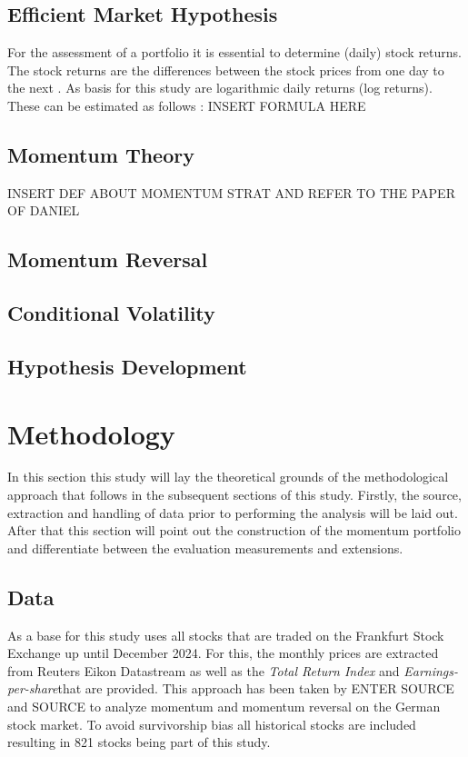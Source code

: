 \documentclass[12pt]{article}
\begin{document}
\subsection{Efficient Market Hypothesis} \label{subsection:EMH}
For the assessment of a portfolio it is essential to determine (daily) stock returns. The stock returns are the differences between the stock prices from one day to the next \parencite{Tsay2002}. As basis for this study are logarithmic daily returns (log returns). These can be estimated as follows \parencite{Tsay2002}: 
INSERT FORMULA HERE



\subsection{Momentum Theory} \label{subsection:Momentum_theory}

INSERT DEF ABOUT MOMENTUM STRAT
AND REFER TO THE PAPER OF DANIEL


\subsection{Momentum Reversal} \label{subsection:Momentum_reversal}

\subsection{Conditional Volatility} \label{subsection:condvol}


\subsection{Hypothesis Development} \label{subsection:Hypotheses}


\section{Methodology} \label{section:Method}
In this section this study will lay the theoretical grounds of the methodological approach that follows in the subsequent sections of this study. Firstly, the source, extraction and handling of data prior to performing the analysis will be laid out. After that this section will point out the construction of the momentum portfolio and differentiate between the evaluation measurements and extensions.

\subsection{Data} \label{subsection:Data}
As a base for this study uses all stocks that are traded on the Frankfurt Stock Exchange up until December 2024. For this, the monthly prices are extracted from Reuters Eikon Datastream as well as the \textit{Total Return Index} and \textit{Earnings-per-share}that are provided. This approach has been taken by ENTER SOURCE and SOURCE to analyze momentum and momentum reversal on the German stock market. To avoid survivorship bias all historical stocks are included resulting in 821 stocks being part of this study.
\end{document}
